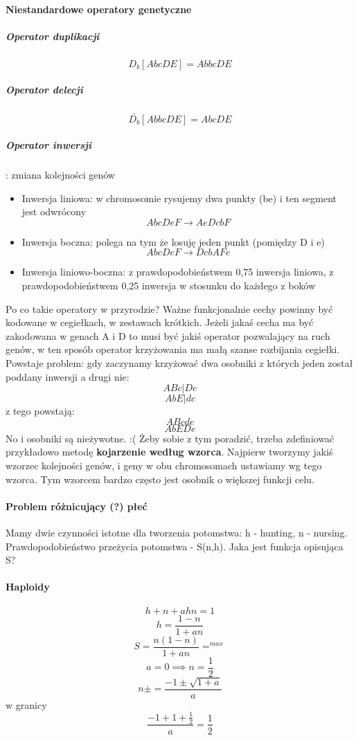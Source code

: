 \documentclass{article}
\begin{document}
		\paragraph{Niestandardowe operatory genetyczne}
		\subparagraph{Operator duplikacji} $$D_b[AbcDE] = AbbcDE$$
		\subparagraph{Operator delecji} $$\bar{D_b}[AbbcDE] = AbcDE$$
		\subparagraph{Operator inwersji}: zmiana kolejności genów $$$$
		\begin{itemize}
			\item Inwersja liniowa: w chromosomie rysujemy dwa punkty  (be) i ten segment jest odwrócony$$AbcDeF \rightarrow AeDcbF$$
			\item Inwersja boczna: polega na tym że losuję jeden punkt (pomiędzy D i e) $$AbcDeF \rightarrow DcbAFe$$
			\item Inwersja liniowo-boczna: z prawdopodobieństwem 0,75 inwersja liniowa, z prawdopodobieństwem 0,25 inwersja w stosunku do każdego z boków 
		\end{itemize}
		
		Po co takie operatory w przyrodzie? Ważne funkcjonalnie cechy powinny być kodowane w cegiełkach, w zestawach krótkich. Jeżeli jakaś cecha ma być zakodowana w genach A i D to musi być jakiś operator pozwalający na ruch genów, w ten sposób operator krzyżowania ma małą szanse rozbijania cegiełki. \\
		Powstaje problem: gdy zaczynamy krzyżować dwa osobniki z których jeden został poddany inwersji a drugi nie: 
		$$ABc|De$$
		$$AbE|dc$$
		z tego powstają:
		$$ABcde$$
		$$AbEDe$$
		No i osobniki są nieżywotne. :(
		Żeby sobie z tym poradzić, trzeba zdefiniować przykładowo metodę \textbf{kojarzenie według wzorca}. Najpierw tworzymy jakiś wzorzec kolejności genów, i geny w obu chromosomach ustawiamy wg tego wzorca. Tym wzorcem bardzo często jest osobnik o większej funkcji celu. 
		\paragraph{Problem różnicujący (?) płeć}Mamy dwie czynności istotne dla tworzenia potomstwa: h - hunting, n - nursing. Prawdopodobieństwo przeżycia potomstwa - S(n,h).
		Jaka jest funkcja opisująca S?
		\paragraph{Haploidy}
		$$h + n + ahn = 1$$
		$$h = \frac{1-n}{1+an}$$
		$$S = \frac{n(1-n)}{1+an}=^{max}$$
		$$a=0 \implies n=\frac{1}{2}$$
		$$n \pm = \frac{-1 \pm \sqrt{1+a}}{a}$$
		w granicy
		$$\frac{-1 +1 +\frac{1}{2}}{a} = \frac{1}{2}$$
\end{document}
